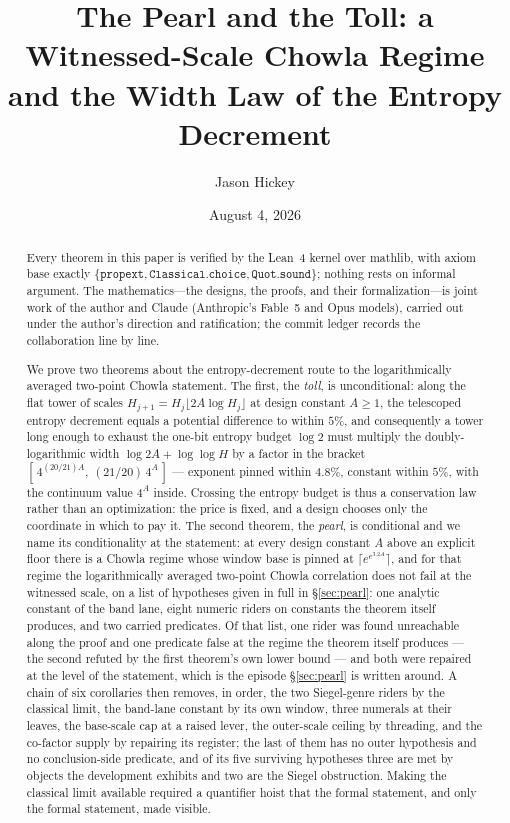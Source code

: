 \documentclass[11pt]{amsart}
\title[The Pearl and the Toll]{The Pearl and the Toll: a Witnessed-Scale
Chowla Regime and the Width Law of the Entropy Decrement}
\author{Jason Hickey}
\date{August 4, 2026}
\theoremstyle{remark}
\begin{document}
\begin{abstract}
Every theorem in this paper is verified by the Lean~4 kernel over
\textsf{mathlib}, with axiom base exactly
$\{\texttt{propext}, \texttt{Classical.choice}, \texttt{Quot.sound}\}$;
nothing rests on informal argument. The mathematics---the designs, the
proofs, and their formalization---is joint work of the author and Claude
(Anthropic's Fable~5 and Opus models), carried out under the author's
direction and ratification; the commit ledger records the collaboration
line by line.

We prove two theorems about the entropy-decrement route to the
logarithmically averaged two-point Chowla statement. The first, the
\emph{toll}, is unconditional: along the flat tower of scales
$H_{j+1} = H_j\lfloor 2A\log H_j\rfloor$ at design constant $A \ge 1$, the
telescoped entropy decrement equals a potential difference to within
$5\%$, and consequently a tower long enough to exhaust the one-bit entropy
budget $\log 2$ must multiply the doubly-logarithmic width
$\log 2A + \log\log H$ by a factor in the bracket
$[\,4^{(20/21)A},\ (21/20)\,4^{A}\,]$ --- exponent pinned within $4.8\%$,
constant within $5\%$, with the continuum value $4^{A}$ inside. Crossing
the entropy budget is thus a conservation law rather than an optimization:
the price is fixed, and a design chooses only the coordinate in which to
pay it. The second theorem, the \emph{pearl}, is conditional and we name
its conditionality at the statement: at every design constant $A$ above an
explicit floor there is a Chowla regime whose window base is pinned at
$\lceil e^{e^{3.2A}}\rceil$, and for that regime the logarithmically
averaged two-point Chowla correlation does not fail at the witnessed
scale, on a list of hypotheses given in full in \S\ref{sec:pearl}: one
analytic constant of the band lane, eight numeric riders on constants the
theorem itself produces, and two carried predicates. Of that list, one
rider was found unreachable along the proof and one predicate false at the
regime the theorem itself produces --- the second refuted by the first
theorem's own lower bound --- and both were repaired at the level of the
statement, which is the episode \S\ref{sec:pearl} is written around. A
chain of six corollaries then removes, in order, the two Siegel-genre
riders by the classical limit, the band-lane constant by its own window,
three numerals at their leaves, the base-scale cap at a raised lever, the
outer-scale ceiling by threading, and the co-factor supply by repairing
its register; the last of them has no outer hypothesis and no
conclusion-side predicate, and of its five surviving hypotheses three are
met by objects the development exhibits and two are the Siegel
obstruction. Making the classical limit available required a quantifier
hoist that the formal statement, and only the formal statement, made
visible.
\end{abstract}
\end{document}
